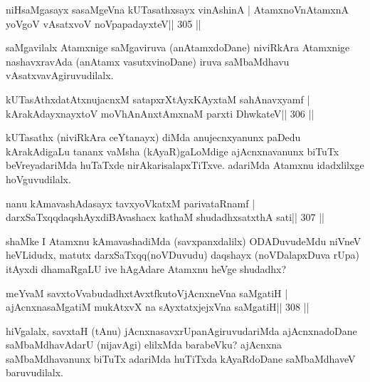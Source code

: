 \begin{shl}
niHsaMgasayx sasaMgeVna kUTasathxsayx vinAshinA |
AtamxnoV\s nAtamxnA yoVgoV vAsatxvoV noVpapadayxteV\hfill || 305 ||
\end{shl}

\begin{artha}
saMgavilalx Atamxnige saMgaviruva (anAtamxdoDane) niviRkAra Atamxnige nashavxravAda (anAtamx vasutxvinoDane) iruva saMbaMdhavu vAsatxvavAgiruvudilalx.
\end{artha}


\begin{shl}
kUTasAthxdatAtxnujacnxM satapxrXtAyxKAyxtaM sahAnavxyamf |
kArakAdayxnayxtoV moVhAnAnx\s\s tAmxnaM parxti DhwkateV\hfill || 306 ||
\end{shl}

\begin{artha}
kUTasathx (niviRkAra ceYtanayx) diMda anujecnxyanunx paDedu 
kArakAdigaLu tananx vaMsha (kAyaR)gaLoMdige ajAcnxnavanunx biTuTx beVreyadariMda huTaTxde nirAkarisalapxTiTxve. adariMda Atamxnu idadxlilxge hoVguvudilalx.
\end{artha}

\begin{shl}
nanu kAmavashAdasayx tavxyoVkatxM parivataRnamf |
darxSaTxqqdaqshAyxdiBAvashacx kathaM shudadhxsatxthA sati\hfill || 307 ||
\end{shl}

\begin{artha}
shaMke  \mdash  I Atamxnu kAmavashadiMda (savxpanxdalilx) ODADuvudeMdu 
niVneV heVLidudx, matutx darxSaTxqq(noVDuvudu) daqshayx (noVDalapxDuva rUpa) itAyxdi dhamaRgaLU ive hAgAdare Atamxnu heVge shudadhx?
\end{artha}


\begin{shl}
meYvaM savxtoV\s vabudadhxtAvxtfkutoV\s jAcnxneVna saMgatiH |
ajAcnxnasaMgatiM mukAtxvX na sAyxtatxjejxVna saMgatiH\hfill || 308 ||
\end{shl}

\begin{artha}
hiVgalalx, savxtaH (tAnu) jAcnxnasavxrUpanAgiruvudariMda ajAcnxnadoDane saMbaMdhavAdarU (nijavAgi) elilxMda barabeVku? ajAcnxna saMbaMdhavanunx biTuTx adariMda huTiTxda kAyaRdoDane saMbaMdhaveV baruvudilalx.
\end{artha}


